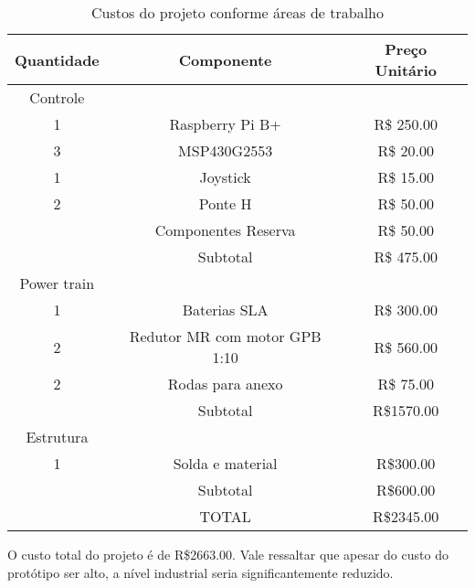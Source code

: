 \begin{table}[!ht]
\centering
\begin{tabular}{ |c|c|c| }
 \hline
Quantidade & Componente & Preço Unitário\\
 \hline
Controle &  & \\
 1 & Raspberry Pi B+   &  R\$ 250.00 \\
 3 & MSP430G2553  & R\$ 20.00 \\
 1 & Joystick  & R\$ 15.00 \\
 2 & Ponte H &  R\$ 50.00 \\
  & Componentes Reserva & R\$ 50.00\\
& Subtotal & R\$ 475.00\\ \hline

Power train &  & \\
1 & Baterias SLA  & R\$ 300.00\\
2 & Redutor MR com motor GPB 1:10 &  R\$ 560.00\\
2 & Rodas para anexo & R\$ 75.00\\
& Subtotal &  R\$1570.00\\ \hline

Estrutura &  & \\
1 &  Solda e material & R\$300.00\\
 & Subtotal & R\$600.00 \\ \hline

& TOTAL &  R\$2345.00\\ \hline
\end{tabular}
\caption{Custos do projeto conforme áreas de trabalho}
\label{tab:custos_tabela}
\end{table}

O custo total do projeto é de R\$2663.00.  Vale ressaltar que apesar do custo do protótipo ser alto, a nível industrial seria significantemente reduzido.
